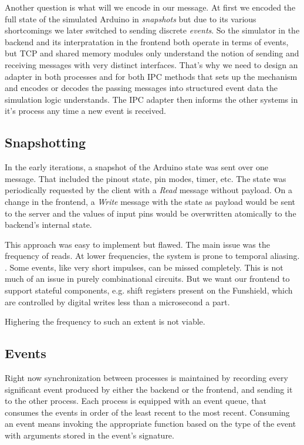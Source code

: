 Another question is what will we encode in our message. At first we encoded the full state of the simulated Arduino in \textit{snapshots} but due to its various shortcomings we later switched to sending discrete \textit{events}. So the simulator in the backend and its interpratation in the frontend both operate in terms of events, but TCP and shared memory modules only understand the notion of sending and receiving messages with very distinct interfaces. That's why we need to design an adapter in both processes and for both IPC methods that sets up the mechanism and encodes or decodes the passing messages into structured event data the simulation logic understands. The IPC adapter then informs the other systems in it's process any time a new event is received.

\subsection{Snapshotting}

In the early iterations, a snapshot of the Arduino state was sent over one message. That included the pinout state, pin modes, timer, etc. The state was periodically requested by the client with a \textit{Read} message without payload. On a change in the frontend, a \textit{Write} message with the state as payload would be sent to the server and the values of input pins would be overwritten atomically to the backend's internal state. 

This approach was easy to implement but flawed. The main issue was the frequency of reads. At lower frequencies, the system is prone to temporal aliasing. . Some events, like very short impulses, can be missed completely. This is not much of an issue in purely combinational circuits. But we want our frontend to support stateful components, e.g. shift registers present on the Funshield, which are controlled by digital writes less than a microsecond a part.

Highering the frequency to such an extent is not viable. 

\subsection{Events}\label{subsec:events}

Right now synchronization between processes is maintained by recording every significant event produced by either the backend or the frontend, and sending it to the other process. Each process is equipped with an event queue, that consumes the events in order of the least recent to the most recent. Consuming an event means invoking the appropriate function based on the type of the event with arguments stored in the event's signature. 

